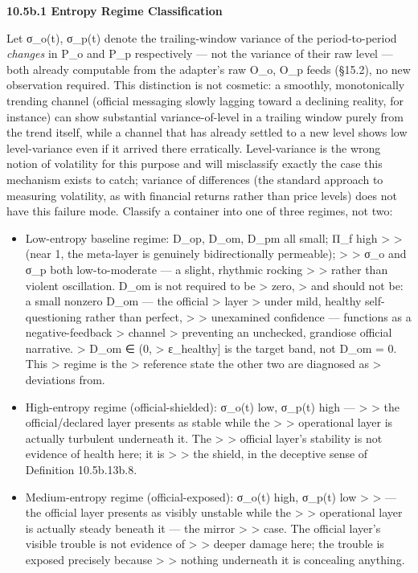 \documentclass[
]{article}
\begin{document}
\textbf{10.5b.1 Entropy Regime Classification}

Let σ\_o(t), σ\_p(t) denote the trailing-window variance of the
period-to-period \emph{changes} in P\_o and P\_p respectively --- not
the variance of their raw level --- both already computable from the
adapter's raw O\_o, O\_p feeds (§15.2), no new observation required.
This distinction is not cosmetic: a smoothly, monotonically trending
channel (official messaging slowly lagging toward a declining reality,
for instance) can show substantial variance-of-level in a trailing
window purely from the trend itself, while a channel that has already
settled to a new level shows low level-variance even if it arrived there
erratically. Level-variance is the wrong notion of volatility for this
purpose and will misclassify exactly the case this mechanism exists to
catch; variance of differences (the standard approach to measuring
volatility, as with financial returns rather than price levels) does not
have this failure mode. Classify a container into one of three regimes,
not two:

\begin{itemize}
\item
  Low-entropy baseline regime: D\_op, D\_om, D\_pm all small; Π\_f high
  \textgreater{} \textgreater{} (near 1, the meta-layer is genuinely
  bidirectionally permeable); \textgreater{} \textgreater{} σ\_o and
  σ\_p both low-to-moderate --- a slight, rhythmic rocking
  \textgreater{} \textgreater{} rather than violent oscillation. D\_om
  is not required to be \textgreater{} zero, \textgreater{} and should
  not be: a small nonzero D\_om --- the official \textgreater{} layer
  \textgreater{} under mild, healthy self-questioning rather than
  perfect, \textgreater{} \textgreater{} unexamined confidence ---
  functions as a negative-feedback \textgreater{} channel \textgreater{}
  preventing an unchecked, grandiose official narrative. \textgreater{}
  D\_om ∈ (0, \textgreater{} ε\_healthy{]} is the target band, not D\_om
  = 0. This \textgreater{} regime is the \textgreater{} reference state
  the other two are diagnosed as \textgreater{} deviations from.
\item
  High-entropy regime (official-shielded): σ\_o(t) low, σ\_p(t) high ---
  \textgreater{} \textgreater{} the official/declared layer presents as
  stable while the \textgreater{} \textgreater{} operational layer is
  actually turbulent underneath it. The \textgreater{} \textgreater{}
  official layer's stability is not evidence of health here; it is
  \textgreater{} \textgreater{} the shield, in the deceptive sense of
  Definition 10.5b.13b.8.
\item
  Medium-entropy regime (official-exposed): σ\_o(t) high, σ\_p(t) low
  \textgreater{} \textgreater{} --- the official layer presents as
  visibly unstable while the \textgreater{} \textgreater{} operational
  layer is actually steady beneath it --- the mirror \textgreater{}
  \textgreater{} case. The official layer's visible trouble is not
  evidence of \textgreater{} \textgreater{} deeper damage here; the
  trouble is exposed precisely because \textgreater{} \textgreater{}
  nothing underneath it is concealing anything.
\end{itemize}
\end{document}
